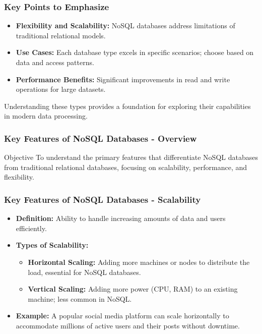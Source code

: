 \documentclass[aspectratio=169]{beamer}
\begin{document}
\begin{frame}[fragile]
    \frametitle{Key Points to Emphasize}
    \begin{itemize}
        \item \textbf{Flexibility and Scalability:}
        NoSQL databases address limitations of traditional relational models.
        
        \item \textbf{Use Cases:}
        Each database type excels in specific scenarios; choose based on data and access patterns.
        
        \item \textbf{Performance Benefits:}
        Significant improvements in read and write operations for large datasets.
    \end{itemize}
    
    Understanding these types provides a foundation for exploring their capabilities in modern data processing.
\end{frame}

\begin{frame}[fragile]
    \frametitle{Key Features of NoSQL Databases - Overview}
    \begin{block}{Objective}
        To understand the primary features that differentiate NoSQL databases from traditional relational databases, focusing on scalability, performance, and flexibility.
    \end{block}
\end{frame}

\begin{frame}[fragile]
    \frametitle{Key Features of NoSQL Databases - Scalability}
    \begin{itemize}
        \item \textbf{Definition:} Ability to handle increasing amounts of data and users efficiently.
        \item \textbf{Types of Scalability:}
        \begin{itemize}
            \item \textbf{Horizontal Scaling:} Adding more machines or nodes to distribute the load, essential for NoSQL databases.
            \item \textbf{Vertical Scaling:} Adding more power (CPU, RAM) to an existing machine; less common in NoSQL.
        \end{itemize}
        \item \textbf{Example:} A popular social media platform can scale horizontally to accommodate millions of active users and their posts without downtime.
    \end{itemize}
\end{frame}
\end{document}
